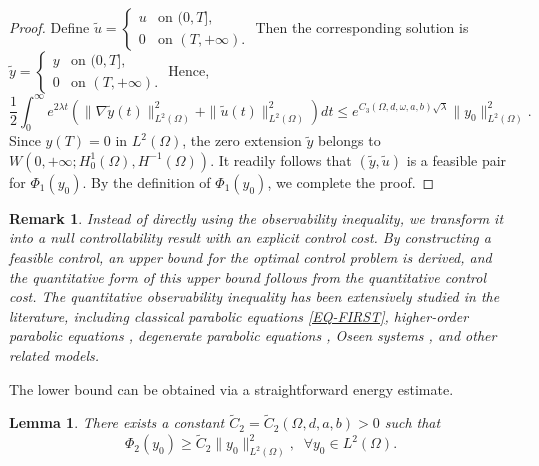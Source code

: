\documentclass[a4paper]{article}
\newtheorem{lemma}[theorem]{Lemma}
\newtheorem{remark}[theorem]{Remark}
\numberwithin{equation}{section}
\begin{document}
\begin{proof}
Define $\widetilde{u} = \begin{cases} u & \text{on } (0,T], \\ 0 & \text{on } (T,+\infty). \end{cases}$ Then the corresponding solution is $\widetilde{y} = \begin{cases} y & \text{on } (0,T], \\ 0 & \text{on } (T,+\infty). \end{cases}$
Hence,
$$\frac{1}{2} \int_0^\infty e^{2\lambda t}\left(\|\nabla \widetilde{y}(t)\|_{L^2(\Omega)}^2 + \|\widetilde{u}(t)\|_{L^2(\Omega)}^2\right) dt\leq e^{C_3(\Omega,d,\omega,a,b)\sqrt{\lambda}} \|y_0\|_{L^2(\Omega)}^2.$$
Since $y(T)=0$ in $L^2(\Omega)$, the zero extension $\widetilde y$ belongs to
$W(0,+\infty;H_0^1(\Omega),H^{-1}(\Omega))$. It readily follows that $(\widetilde y,\widetilde u)$ is a feasible pair for $\Phi_1(y_0)$. By the definition of $\Phi_1(y_0)$, we complete the proof.
\end{proof}

\begin{remark}\label{obs-quanti-remark}
Instead of directly using the observability inequality, we transform it into a null controllability result with an explicit control cost. By constructing a feasible control, an upper bound for the optimal control problem is derived, and the quantitative form of this upper bound follows from the quantitative control cost. The quantitative observability inequality has been extensively studied in the literature, including classical parabolic equations \eqref{EQ-FIRST}, higher-order parabolic equations \cite{EMZ}, degenerate parabolic equations \cite{LWYZ}, Oseen systems \cite{BT,FCGIP}, and other related models.
\end{remark}

The lower bound can be obtained via a straightforward energy estimate.

\begin{lemma}\label{PHIBOUND-NEW-18}
There exists a constant $\tilde{C}_2=\tilde{C}_2(\Omega,d,a,b)>0$ such that
\begin{equation}\label{PHI-bound-low-523} 
{\Phi_2} (y_0) \ge \tilde C_2\|y_0\|_{L^2(\Omega)}^2,\;\;\forall y_0\in L^2(\Omega).
\end{equation}
\end{lemma}
\end{document}
